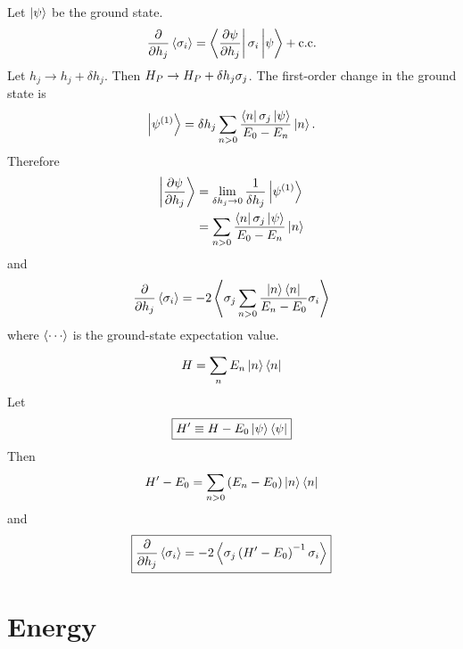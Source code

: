 Let $\left| \psi \right>$ be the ground state.
\begin{equation}
  \pd{}{h_j} \avg{\sigma_i}
  = \matrixel{\pd{\psi}{h_j}}{\sigma_i}{\psi} + \cc
  \label{}
\end{equation}
Let
$h_j \rightarrow h_j + \delta h_j$.
Then
$H_P \rightarrow H_P + \delta h_j \sigma_j$.
The first-order change in the ground state is
\begin{equation}
  \ket{\psi^{(1)}}
  = \delta h_j \sum_{n>0} \frac{\matrixel{n}{\sigma_j}{\psi}}{E_0 - E_n} \ket{n}.
  \label{}
\end{equation}
Therefore
\begin{align}
  \ket{\pd{\psi}{h_j}}
  &= \lim_{\delta h_j \rightarrow 0} \frac{1}{\delta h_j} \ket{\psi^{(1)}} \\
  &= \sum_{n>0} \frac{\matrixel{n}{\sigma_j}{\psi}}{E_0 - E_n} \ket{n}
  \label{}
\end{align}
and
\begin{equation}
  \frac{\partial }{\partial h_j} \left< \sigma_i \right>
  = -2 \left< \sigma_j \sum_{n>0} \frac{\left| n \right> \left< n \right|}{E_n - E_0} \sigma_i \right>
  \label{}
\end{equation}
where $\avg{\cdots}$ is the ground-state expectation value.

\begin{equation}
  H = \sum_n E_n \left| n \right> \left< n \right|
  \label{}
\end{equation}
Let
\begin{equation}
  \boxed{
  H^{\prime} \equiv H - E_0 \left| \psi \right> \left< \psi \right|
  }
  \label{}
\end{equation}
Then
\begin{equation}
  H^{\prime} - E_0 = \sum_{n>0} \left( E_n - E_0 \right) \left| n \right> \left< n \right|
  \label{}
\end{equation}
and
\begin{equation}
  \boxed{
  \frac{\partial }{\partial h_j} \left< \sigma_i \right>
  = -2 \left< \sigma_j \left( H^{\prime} - E_0 \right)^{-1} \sigma_i \right>
  }
  \label{}
\end{equation}

\section*{Energy}

